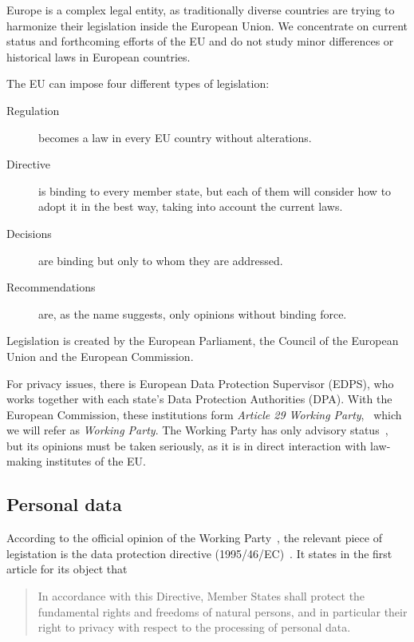 \documentclass[12pt,a4paper,oneside,pdftex]{report}
\begin{document}
Europe is a complex legal entity, as traditionally diverse countries are trying to harmonize their legislation inside the European Union. We concentrate on current status and forthcoming efforts of the EU and do not study minor differences or historical laws in European countries.

The EU can impose four different types of legislation:~\cite{lisbon_288}
\begin{description}
     \item[Regulation] becomes a law in every EU country without alterations.
     \item[Directive] is binding to every member state, but each of them will consider how to adopt it in the best way, taking into account the current laws.
     \item[Decisions] are binding but only to whom they are addressed.
     \item[Recommendations] are, as the name suggests, only opinions without binding force.
\end{description}

Legislation is created by the European Parliament, the Council of the European Union and the European Commission.~\cite{eu_institutions}

For privacy issues, there is European Data Protection Supervisor (EDPS), who works together with each state's Data Protection Authorities (DPA). With the European Commission, these institutions form \emph{Article 29 Working Party},~\cite{wp29_rules} which we will refer as \emph{Working Party}. The Working Party has only advisory status~\cite{wp29_rules}, but its opinions must be taken seriously, as it is in direct interaction with law-making institutes of the EU.

\subsection{Personal data}
\label{subsec:eu:personal_data}

According to the official opinion of the Working Party~\cite{wp29_185}, the relevant piece of legistation is the data protection directive (1995/46/EC)~\cite{data_protection}. It states in the first article for its object that

\begin{quote}
    In accordance with this Directive, Member States shall protect the fundamental rights and freedoms of natural persons, and in particular their right to privacy with respect to the processing of personal data.
\end{quote}
\end{document}
